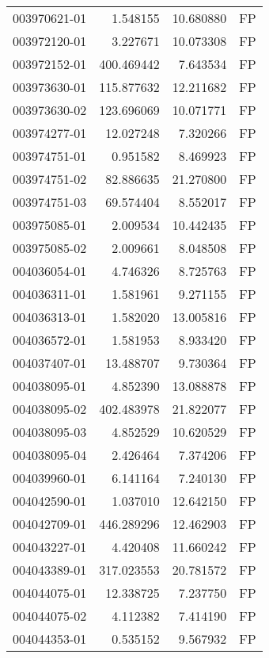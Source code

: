 \begin{tabular}{lrrl}
003970621-01 &    1.548155 &      10.680880 &   FP \\
003972120-01 &    3.227671 &      10.073308 &   FP \\
003972152-01 &  400.469442 &       7.643534 &   FP \\
003973630-01 &  115.877632 &      12.211682 &   FP \\
003973630-02 &  123.696069 &      10.071771 &   FP \\
003974277-01 &   12.027248 &       7.320266 &   FP \\
003974751-01 &    0.951582 &       8.469923 &   FP \\
003974751-02 &   82.886635 &      21.270800 &   FP \\
003974751-03 &   69.574404 &       8.552017 &   FP \\
003975085-01 &    2.009534 &      10.442435 &   FP \\
003975085-02 &    2.009661 &       8.048508 &   FP \\
004036054-01 &    4.746326 &       8.725763 &   FP \\
004036311-01 &    1.581961 &       9.271155 &   FP \\
004036313-01 &    1.582020 &      13.005816 &   FP \\
004036572-01 &    1.581953 &       8.933420 &   FP \\
004037407-01 &   13.488707 &       9.730364 &   FP \\
004038095-01 &    4.852390 &      13.088878 &   FP \\
004038095-02 &  402.483978 &      21.822077 &   FP \\
004038095-03 &    4.852529 &      10.620529 &   FP \\
004038095-04 &    2.426464 &       7.374206 &   FP \\
004039960-01 &    6.141164 &       7.240130 &   FP \\
004042590-01 &    1.037010 &      12.642150 &   FP \\
004042709-01 &  446.289296 &      12.462903 &   FP \\
004043227-01 &    4.420408 &      11.660242 &   FP \\
004043389-01 &  317.023553 &      20.781572 &   FP \\
004044075-01 &   12.338725 &       7.237750 &   FP \\
004044075-02 &    4.112382 &       7.414190 &   FP \\
004044353-01 &    0.535152 &       9.567932 &   FP \\

\end{tabular}

